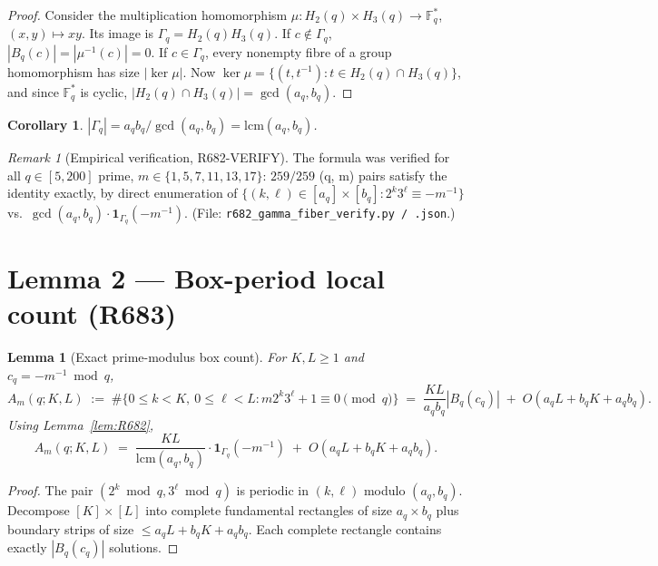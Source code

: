 \documentclass[12pt]{amsart}
\newtheorem{lemma}{Lemma}
\newtheorem{corollary}{Corollary}
\theoremstyle{definition}
\theoremstyle{remark}
\newtheorem{remark}{Remark}
\begin{document}
\begin{proof}
Consider the multiplication homomorphism $\mu : H_2(q) \times H_3(q) \to \mathbb{F}_q^*$,
$(x, y) \mapsto xy$. Its image is $\Gamma_q = H_2(q) H_3(q)$. If $c \notin \Gamma_q$,
$|B_q(c)| = |\mu^{-1}(c)| = 0$. If $c \in \Gamma_q$, every nonempty fibre of a group
homomorphism has size $|\ker \mu|$. Now
$\ker \mu = \{(t, t^{-1}) : t \in H_2(q) \cap H_3(q)\}$, and since $\mathbb{F}_q^*$ is
cyclic, $|H_2(q) \cap H_3(q)| = \gcd(a_q, b_q)$.
\end{proof}

\begin{corollary}\label{cor:Gamma-size}
$|\Gamma_q| = a_q b_q / \gcd(a_q, b_q) = \mathrm{lcm}(a_q, b_q)$.
\end{corollary}

\begin{remark}[Empirical verification, R682-VERIFY]
The formula was verified for all $q \in [5, 200]$ prime, $m \in \{1, 5, 7, 11, 13, 17\}$:
$259/259$ (q, m) pairs satisfy the identity exactly, by direct enumeration of
$\{(k, \ell) \in [a_q] \times [b_q] : 2^k 3^\ell \equiv -m^{-1}\}$ vs.\
$\gcd(a_q, b_q) \cdot \mathbf{1}_{\Gamma_q}(-m^{-1})$.
\hfill(File: \texttt{r682\_gamma\_fiber\_verify.py / .json}.)
\end{remark}

\section{Lemma 2 --- Box-period local count (R683)}

\begin{lemma}[Exact prime-modulus box count]\label{lem:R683}
For $K, L \ge 1$ and $c_q = -m^{-1} \bmod q$,
$$
A_m(q; K, L)
\;:=\;
\# \{0 \le k < K,\ 0 \le \ell < L : m 2^k 3^\ell + 1 \equiv 0 \pmod q\}
\;=\;
\frac{KL}{a_q b_q} |B_q(c_q)|
\;+\;
O(a_q L + b_q K + a_q b_q).
$$
Using Lemma~\ref{lem:R682},
$$
A_m(q; K, L)
\;=\;
\frac{KL}{\mathrm{lcm}(a_q, b_q)} \cdot \mathbf{1}_{\Gamma_q}(-m^{-1})
\;+\;
O(a_q L + b_q K + a_q b_q).
$$
\end{lemma}

\begin{proof}
The pair $(2^k \bmod q, 3^\ell \bmod q)$ is periodic in $(k, \ell)$ modulo $(a_q, b_q)$.
Decompose $[K] \times [L]$ into complete fundamental rectangles of size $a_q \times b_q$
plus boundary strips of size $\le a_q L + b_q K + a_q b_q$.
Each complete rectangle contains exactly $|B_q(c_q)|$ solutions.
\end{proof}
\end{document}
